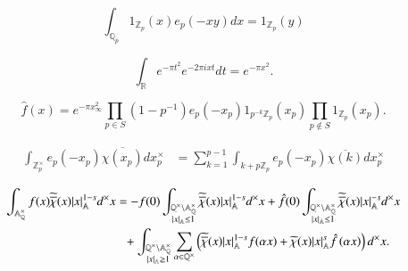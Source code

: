 \documentclass[a4paper, 12pt]{article}
\theoremstyle{Mydefinition}
\theoremstyle{Mytheorem}
\begin{document}
\begin{enumerate}
    \begin{equation}
        \int_{\mathbb{Q}_p} 1_{\mathbb{Z}_p}(x)e_p(-xy)dx = 1_{\mathbb{Z}_p}(y)
    \end{equation}
    
    \begin{equation}
        \int_{\mathbb{R}} e^{-\pi t^2} e^{-2\pi i xt} dt = e^{-\pi x^2}.
    \end{equation}
    
    
    \begin{equation}
        \hat{f}(x) = e^{-\pi x_\infty^2}\prod_{p\in S}\left(1-p^{-1}\right)e_p(-x_p)1_{p^{-k}\mathbb{Z}_p}(x_p)\prod_{p\not\in S}1_{\mathbb{Z}_p}(x_p).
    \end{equation}
    
    \begin{equation}
    \begin{split}
        \int_{\mathbb{Z}^\times_p}e_p(- x_p)\overline{\chi(x_p)}dx^\times_p &= \sum_{k=1}^{p-1}\int_{k+p\mathbb{Z}_p}e_p(- x_p)\overline{\chi(k)}dx^\times_p
    \end{split}
    \end{equation}
    
    \begin{equation}
        \begin{split}
        \int_{\mathbb{A}_\mathbb{Q}^\times} f(x)\widetilde{\overline{\chi}}(x)\abs{x}_{\mathbb{A}}^{1-s} d^\times x &= -f(0)\int_{\substack{\mathbb{Q}^\times\backslash \mathbb{A}_\mathbb{Q}^\times \\ \abs{x}_\mathbb{A}\leq 1}} \widetilde{\overline{\chi}}(x)\abs{x}_{\mathbb{A}}^{1-s} d^\times x + \hat{f}(0)\int_{\substack{\mathbb{Q}^\times\backslash \mathbb{A}_\mathbb{Q}^\times \\ \abs{x}_\mathbb{A}\leq 1}} \widetilde{\overline{\chi}}(x)\abs{x}_{\mathbb{A}}^{-s} d^\times x\\
        &\phantom{=}+\int_{\substack{\mathbb{Q}^\times\backslash \mathbb{A}_\mathbb{Q}^\times \\ \abs{x}_\mathbb{A}\geq 1}}\sum_{\alpha\in \mathbb{Q}^\times}\left(\widetilde{\overline{\chi}}(x)\abs{x}_{\mathbb{A}}^{1-s}f(\alpha x) + \widetilde{\chi}(x)\abs{x}_{\mathbb{A}}^{s}\hat{f}\left(\alpha x\right)\right)d^\times x.
        \end{split}
    \end{equation}
    

\end{enumerate}
\end{document}
